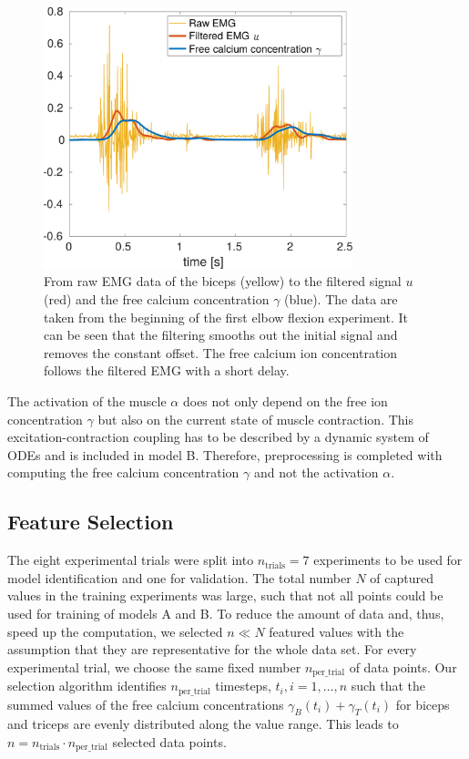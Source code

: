 \begin{figure}%
  \centering%
  \includegraphics[width=0.8\textwidth]{images/summer_school_study/emg_filtering.pdf}%
  \caption{From raw EMG data of the biceps (yellow) to the filtered signal $u$ (red) and the free calcium concentration $\gamma$ (blue). The data are taken from the beginning of the first elbow flexion experiment. It can be seen that the filtering smooths out the initial signal and removes the constant offset. The free calcium ion concentration follows the filtered EMG with a short delay.}%
  \label{fig:emg_filtering}%
\end{figure}%

The activation of the muscle $\alpha$ does not only depend on the free ion concentration $\gamma$ but also on the current state of muscle contraction. This excitation-contraction coupling has to be described by a dynamic system of ODEs and is included in model B.
Therefore, preprocessing is completed with computing the free calcium concentration $\gamma$ and not the activation $\alpha$.

\subsection{Feature Selection} \label{sec:study_feature_selection}

The eight experimental trials were split into $n_\text{trials}=7$ experiments to be used for model identification and one for validation.
The total number $N$ of captured values in the training experiments was large, such that not all points could be used for training of models A and B.
To reduce the amount of data and, thus, speed up the computation, we selected $n \ll N$ featured values with the assumption that they are representative for the whole data set.
For every experimental trial, we choose the same fixed number $n_\text{per\_trial}$ of data points.
Our selection algorithm identifies $n_\text{per\_trial}$ timesteps, $t_i, i=1, \dots, n$ such that the summed values of the free calcium concentrations $\gamma_B(t_i) + \gamma_T(t_i)$ for biceps and triceps are evenly distributed along the value range.
This leads to $n = n_\text{trials} \cdot n_\text{per\_trial}$ selected data points.

